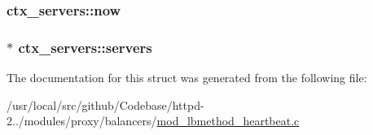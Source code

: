 \subsubsection[{\texorpdfstring{now}{now}}]{ ctx\+\_\+servers\+::now}\hypertarget{structctx__servers_af3508793ee0d707275736bb40e5b3c09}{}\label{structctx__servers_af3508793ee0d707275736bb40e5b3c09}
\subsubsection[{\texorpdfstring{servers}{servers}}]{$\ast$ ctx\+\_\+servers\+::servers}\hypertarget{structctx__servers_a89547889ea6802bc68645d03e74adf57}{}\label{structctx__servers_a89547889ea6802bc68645d03e74adf57}


The documentation for this struct was generated from the following file\+:\begin{DoxyCompactItemize}
\item 
/usr/local/src/github/\+Codebase/httpd-\/2../modules/proxy/balancers/\hyperlink{mod__lbmethod__heartbeat_8c}{mod\+\_\+lbmethod\+\_\+heartbeat.\+c}\end{DoxyCompactItemize}
